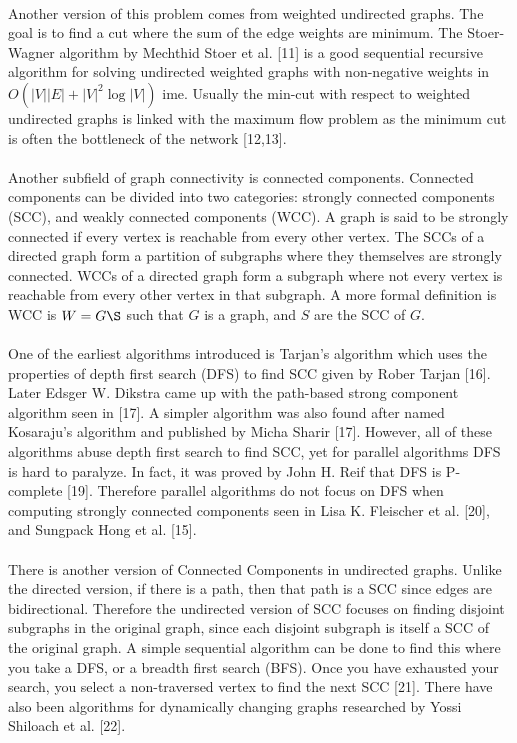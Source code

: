\documentclass[]{article}
\begin{document}
 \paragraph{}
 Another version of this problem comes from weighted undirected graphs. The goal is to find a cut where the sum of the edge weights are minimum. The Stoer-Wagner algorithm by Mechthid Stoer et al. [11]  is a good sequential recursive algorithm for solving undirected weighted graphs with non-negative weights in $O(|V||E|+|V|^2\log|V|)$ ime. Usually the min-cut with respect to weighted undirected graphs is linked with the maximum flow problem as the minimum cut is often the bottleneck of the network [12,13].
 
 \paragraph{}
 Another subfield of graph connectivity is connected components. Connected components can be divided into two categories: strongly connected components (SCC), and weakly connected components (WCC). A graph is said to be strongly connected if every vertex is reachable from every other vertex. The SCCs of a directed graph form a partition of subgraphs where they themselves are strongly connected. WCCs of a directed graph form a subgraph where not every vertex is reachable from every other vertex in that subgraph. A more formal definition is WCC is $W=G\S$ such that $G$ is a graph, and $S$ are the SCC of $G$.
 
 \paragraph{}
 One of the earliest algorithms introduced is Tarjan's algorithm which uses the properties of depth first search (DFS) to find SCC given by Rober Tarjan [16]. Later  Edsger W. Dikstra came up with the path-based strong component algorithm seen in [17]. A simpler algorithm was also found after named Kosaraju's algorithm and published by Micha Sharir [17]. However, all of these algorithms abuse depth first search to find SCC, yet for parallel algorithms DFS is hard to paralyze. In fact, it was proved by John H. Reif that DFS is P-complete [19]. Therefore parallel algorithms do not focus on DFS when computing strongly connected components seen in Lisa K. Fleischer et al. [20], and Sungpack Hong et al. [15].
 
 \paragraph{}
 There is another version of Connected Components in undirected graphs. Unlike the directed version, if there is a path, then that path is a SCC since edges are bidirectional. Therefore the undirected version of SCC focuses on finding disjoint subgraphs in the original graph, since each disjoint subgraph is itself a SCC of the original graph. A simple sequential algorithm can be done to find this where you take a DFS, or a breadth first search (BFS). Once you have exhausted your search, you select a non-traversed vertex to find the next SCC [21]. There have also been algorithms for dynamically changing graphs researched by Yossi Shiloach et al. [22].
 
\end{document}
